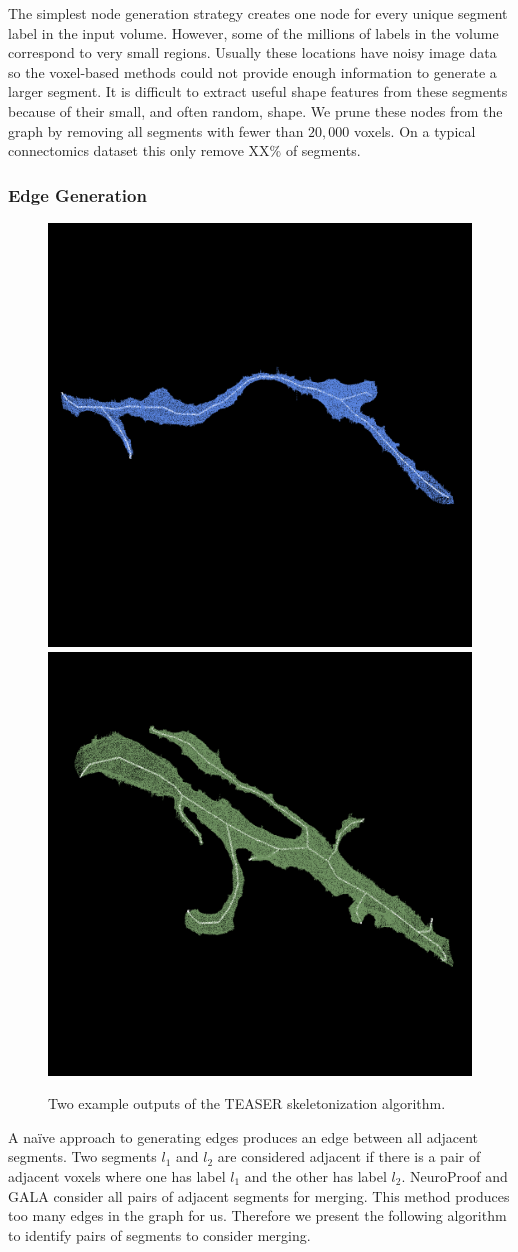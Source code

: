 The simplest node generation strategy creates one node for every unique segment label in the input volume.
However, some of the millions of labels in the volume correspond to very small regions. 
Usually these locations have noisy image data so the voxel-based methods could not provide enough information to generate a larger segment.
It is difficult to extract useful shape features from these segments because of their small, and often random, shape. 
We prune these nodes from the graph by removing all segments with fewer than $20,000$ voxels. 
On a typical connectomics dataset this only remove XX$\%$ of segments. 

\subsubsection{Edge Generation}

\begin{figure}[t]
	\centering
	\includegraphics[width=0.42\linewidth]{./figures/skeleton1.png}
	\hspace{0.085\linewidth}
	\includegraphics[width=0.42\linewidth]{./figures/skeleton2.png}
	\caption{Two example outputs of the TEASER skeletonization algorithm.}
	\label{fig:skeletonization}
\end{figure}

A na\"ive approach to generating edges produces an edge between all adjacent segments.
Two segments $l_1$ and $l_2$ are considered adjacent if there is a pair of adjacent voxels where one has label $l_1$ and the other has label $l_2$. 
NeuroProof and GALA consider all pairs of adjacent segments for merging. 
This method produces too many edges in the graph for us.
Therefore we present the following algorithm to identify pairs of segments to consider merging. 

